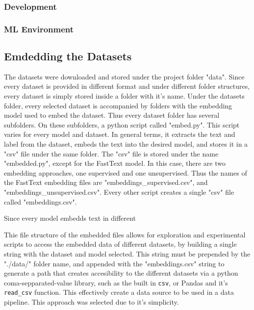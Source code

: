 \subsubsection{Development}\label{subs:Development}
\subsubsection{ML Environment}\label{subs:ML Environment}

\subsection{Emdedding the Datasets}\label{sub:Embedding the Datasets}
The datasets were downloaded and stored under the project folder "data". Since every dataset is provided in different format and under different folder structures, every dataset is simply stored inside a folder with it's name.
Under the datasets folder, every selected dataset is accompanied by folders with the embedding model used to embed the dataset. Thus every dataset folder has several subfolders. On these subfolders, a python script called "embed.py". This script varies for every model and dataset. In general terms, it extracts the text and label from the dataset, embeds the text into the desired model, and stores it in a "csv" file under the same folder.
The "csv" file is stored under the name "embedded.py", except for the FastText model. In this case, there are two embedding approaches, one supervised and one unsupervised. Thus the names of the FastText embedding files are "embeddings_supervised.csv", and "embeddings_unsupervised.csv". Every other script creates a single "csv" file called "embeddings.csv".

Since every model embedds text in different

Thie file structure of the embedded files allows for exploration and experimental scripts to access the embedded data of different datasets, by building a single string with the dataset and model selected. This string must be prepended by the "./data/" folder name, and appended with the "embeddings.csv" string to generate a path that creates accesibility to the different datasets via a python coma-sepparated-value library, such as the built in \lstinline{csv}, or Pandas \cite{TODO} and it's \lstinline{read_csv} function. This effectively create a data source to be used in a data pipeline. This approach was selected due to it's simplicity.

